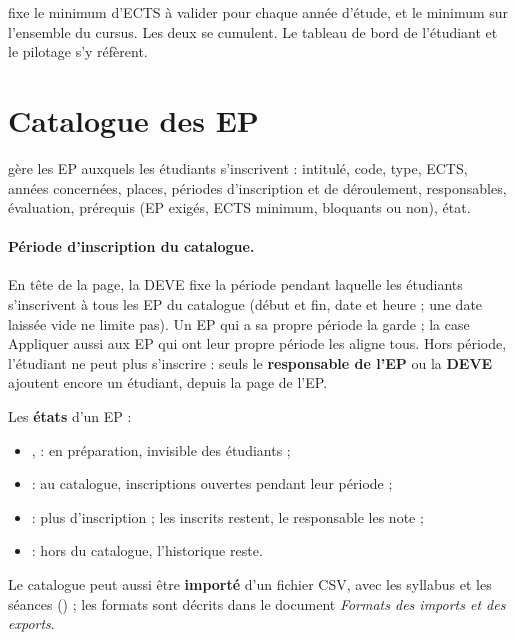 \documentclass[11pt,a4paper]{article}
\begin{document}
 fixe le minimum d'ECTS à valider pour chaque année
d'étude, et le minimum sur l'ensemble du cursus. Les deux se cumulent. Le tableau de bord de
l'étudiant et le pilotage s'y réfèrent.

\section{Catalogue des EP}\label{sec:catalogue}

 gère les EP auxquels les étudiants
s'inscrivent : intitulé, code, type, ECTS, années concernées, places, périodes d'inscription et
de déroulement, responsables, évaluation, prérequis (EP exigés, ECTS minimum, bloquants ou
non), état.


\paragraph{Période d'inscription du catalogue.} En tête de la page, la DEVE fixe la période
pendant laquelle les étudiants s'inscrivent à tous les EP du catalogue (début et fin, date et
heure ; une date laissée vide ne limite pas). Un EP qui a sa propre période la garde ; la case
\og Appliquer aussi aux EP qui ont leur propre période\fg{} les aligne tous. Hors période,
l'étudiant ne peut plus s'inscrire : seuls le \textbf{responsable de l'EP} ou la \textbf{DEVE}
ajoutent encore un étudiant, depuis la page  de l'EP.

Les \textbf{états} d'un EP :
\begin{itemize}
  \item {},  : en préparation, invisible des étudiants ;
  \item {} : au catalogue, inscriptions ouvertes pendant leur période ;
  \item {} : plus d'inscription ; les inscrits restent, le responsable les note ;
  \item {} : hors du catalogue, l'historique reste.
\end{itemize}

Le catalogue peut aussi être \textbf{importé} d'un fichier CSV, avec les syllabus et les séances
() ; les formats sont décrits dans le document
\emph{Formats des imports et des exports}.
\end{document}
